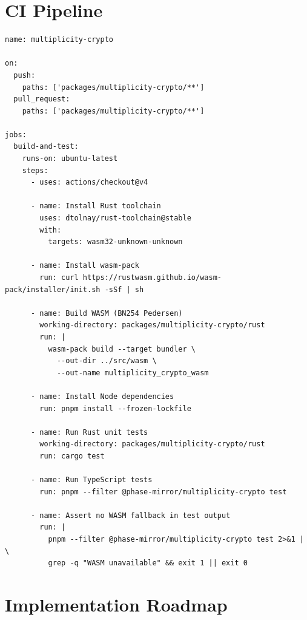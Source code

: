 \documentclass[11pt,letterpaper]{article}
\begin{document}
\section{CI Pipeline}

\begin{lstlisting}[language={},caption={.github/workflows/multiplicity-crypto.yml}]
name: multiplicity-crypto

on:
  push:
    paths: ['packages/multiplicity-crypto/**']
  pull_request:
    paths: ['packages/multiplicity-crypto/**']

jobs:
  build-and-test:
    runs-on: ubuntu-latest
    steps:
      - uses: actions/checkout@v4

      - name: Install Rust toolchain
        uses: dtolnay/rust-toolchain@stable
        with:
          targets: wasm32-unknown-unknown

      - name: Install wasm-pack
        run: curl https://rustwasm.github.io/wasm-pack/installer/init.sh -sSf | sh

      - name: Build WASM (BN254 Pedersen)
        working-directory: packages/multiplicity-crypto/rust
        run: |
          wasm-pack build --target bundler \
            --out-dir ../src/wasm \
            --out-name multiplicity_crypto_wasm

      - name: Install Node dependencies
        run: pnpm install --frozen-lockfile

      - name: Run Rust unit tests
        working-directory: packages/multiplicity-crypto/rust
        run: cargo test

      - name: Run TypeScript tests
        run: pnpm --filter @phase-mirror/multiplicity-crypto test

      - name: Assert no WASM fallback in test output
        run: |
          pnpm --filter @phase-mirror/multiplicity-crypto test 2>&1 | \
          grep -q "WASM unavailable" && exit 1 || exit 0
\end{lstlisting}

\section{Implementation Roadmap}
\end{document}
